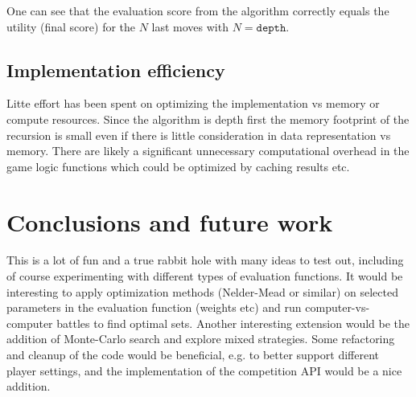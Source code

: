 \documentclass[a4paper]{article}
\begin{document}
One can see that the evaluation score from the algorithm correctly equals the utility (final score) for the $N$ last moves with $N=\texttt{depth}$. 

\subsection{Implementation efficiency}
 Litte effort has been spent on optimizing the implementation vs memory or compute resources. Since the algorithm is depth first the memory footprint of the recursion is small even if there is little consideration in data representation vs memory. There are likely a significant unnecessary computational overhead in the game logic functions which could be optimized by caching results etc.    


\section{Conclusions and future work}
This is a lot of fun and a true rabbit hole with many ideas to test out, including of course experimenting with different types of evaluation functions. It would be interesting to apply optimization methods (Nelder-Mead or similar) on selected parameters in the evaluation function (weights etc) and run computer-vs-computer battles to find optimal sets. Another interesting extension would be the addition of Monte-Carlo search and explore mixed strategies. Some refactoring and cleanup of the code would be beneficial, e.g. to better support different player settings, and the implementation of the competition API would be a nice addition.

\printbibliography
\end{document}
